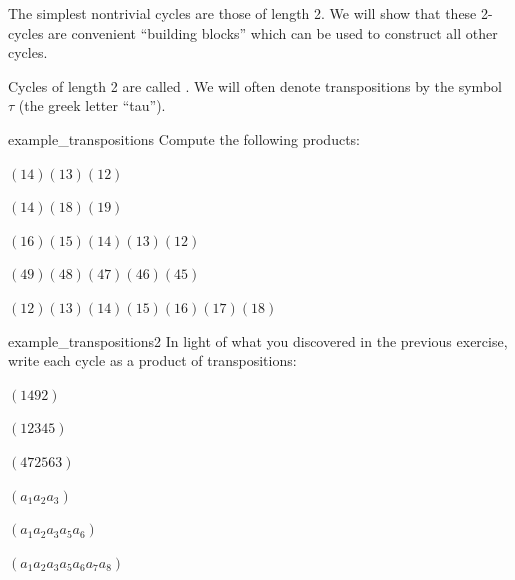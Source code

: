 
The simplest  nontrivial cycles are those of length 2. We will show that these 2-cycles are convenient ``building blocks'' which can be used to construct all other cycles. 

\begin{defn} \label{Transposition}
Cycles of length 2 are called  .   We will often denote transpositions by the symbol $\tau$ (the greek letter ``tau'').
\end{defn}

\begin{exercise}{example_transpositions}
Compute the following products:
\begin{enumerate}[(a)]
\begin{multicols}{2}
\item
$(1 4)(1 3) (1 2)$
\item
$(1 4)(1 8) (1 9)$
\item
$(1 6)(1 5) (1 4)(1 3)(1 2)$
\item
$(4 9)(4 8) (4 7)(4 6)(4 5)$
\item
$(1 2)(1 3)(1 4)(1 5) (1 6)(1 7)(1 8)$

\end{multicols}
\end{enumerate}
\end{exercise}

\begin{exercise}{example_transpositions2}
In light of what you discovered in the previous exercise, write each cycle as a product of transpositions:
\begin{enumerate}[(a)]
\begin{multicols}{3}
\item
$(1 4 9 2)$
\item
$(1 2 3 4 5)$
\item
$(4 7 2 5 6 3)$
\item
$(a_1 a_2 a_3)$
\item
$(a_1 a_2 a_3 a_5 a_6)$
\item
$(a_1 a_2 a_3 a_5 a_6 a_7 a_8)$

\end{multicols}
\end{enumerate}
\end{exercise}

